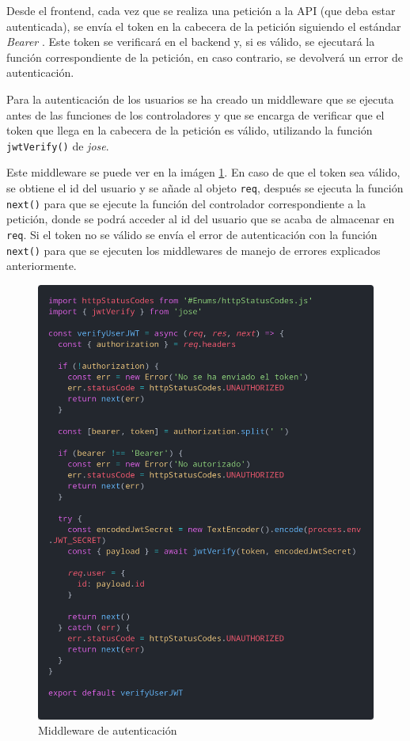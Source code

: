 Desde el frontend, cada vez que se realiza una petición a la API (que deba estar
autenticada), se envía el token en la cabecera de la petición siguiendo el estándar
\textit{Bearer} \cite{bearer}. Este token se verificará en el backend y, si es válido,
se ejecutará la función correspondiente de la petición, en caso contrario, se devolverá
un error de autenticación.

Para la autenticación de los usuarios se ha creado un middleware que se ejecuta antes
de las funciones de los controladores y que se encarga de verificar que el token que
llega en la cabecera de la petición es válido, utilizando la función \texttt{jwtVerify()}
\cite{jose-verify} de \textit{jose}.

Este middleware se puede ver en la imágen \ref{fig:auth-middleware}. En caso de que el
token sea válido, se obtiene el id del usuario y se añade al objeto \texttt{req}, después
se ejecuta la función \texttt{next()} para que se ejecute la función del controlador
correspondiente a la petición, donde se podrá acceder al id del usuario que se acaba de
almacenar en \texttt{req}. Si el token no se válido se envía el error de autenticación
con la función \texttt{next()} para que se ejecuten los middlewares de manejo de errores
explicados anteriormente.

\begin{figure}[H]
  \centering
  \includegraphics[width=1\textwidth]{img/auth-middleware}
  \caption{Middleware de autenticación}
  \label{fig:auth-middleware}
\end{figure}

